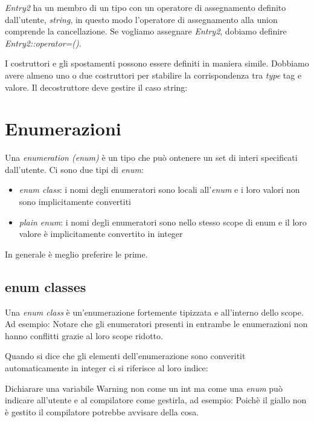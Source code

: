 \documentclass[11pt,a4paper]{book}
\begin{document}
\emph{Entry2} ha un membro di un tipo con un operatore di assegnamento definito dall'utente, \emph{string}, in questo modo l'operatore di assegnamento alla union comprende la cancellazione. Se vogliamo assegnare \emph{Entry2}, dobiamo definire \emph{Entry2::operator=()}.
\label{code: 119}

I costruttori e gli spostamenti possono essere definiti in maniera simile. Dobbiamo avere almeno uno o due costruttori per stabilire la corrispondenza tra \emph{type} tag e valore. Il decostruttore deve gestire il caso string:
\label{code: 120}

\section{Enumerazioni}
Una \emph{enumeration (enum)} è un tipo che può ontenere un set di interi specificati dall'utente.
\label{code: 121}
Ci sono due tipi di \emph{enum}:
\begin{itemize}
	\item \emph{enum class}: i nomi degli enumeratori sono locali all'\emph{enum} e i loro valori non sono implicitamente convertiti
	\item \emph{plain enum}: i nomi degli enumeratori sono nello stesso scope di enum e il loro valore è implicitamente convertito in integer
\end{itemize}
In generale è meglio preferire le prime.

\subsection{enum classes}
Una \emph{enum class} è un'enumerazione fortemente tipizzata e all'interno dello scope. Ad esempio:
\label{code: 122}
Notare che gli enumeratori presenti in entrambe le enumerazioni non hanno conflitti grazie al loro scope ridotto.

Quando si dice che gli elementi dell'enumerazione sono converitit automaticamente in integer ci si riferisce al loro indice:
\label{code: 123}

Dichiarare una variabile Warning non come un int ma come una \emph{enum} può indicare all'utente e al compilatore come gestirla, ad esempio:
\label{code: 124}
Poichè il giallo non è gestito il compilatore potrebbe avvisare della cosa.
\end{document}

